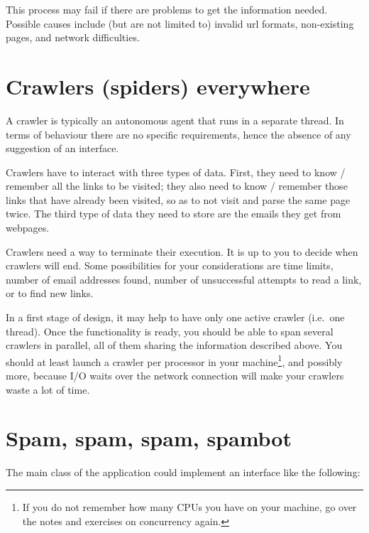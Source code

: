 \documentclass{article}
\begin{document}
This process may fail if there are problems to get the information
needed. Possible causes include (but are not limited to) invalid url
formats, non-existing pages, and network difficulties. 


\section{Crawlers (spiders) everywhere}
\label{sec:crawl-spid-everywh}

A crawler is typically an autonomous agent that runs in a separate
thread. In terms of behaviour there are no specific requirements,
hence the absence of any suggestion of an interface. 

Crawlers have to interact with three types of data. First, they need to
know / remember all the links to be visited; they also need to know /
remember those links that have already been visited, so as to not
visit and parse the same page twice. The third type of data they need
to store are the emails they get from webpages. 

Crawlers need a way to terminate their execution. It is up to you to
decide when crawlers will end. Some possibilities for your
considerations are time limits, number of email addresses found,
number of unsuccessful attempts to read a link, or to find new links.

In a first stage of design, it may help to have only one active
crawler (i.e.~one thread). Once the functionality is ready, you should
be able to span several crawlers in parallel, all of them sharing the
information described above. You should at least launch a crawler per
processor in your machine\footnote{If you do not remember how many
  CPUs you have on your machine, go over the notes and exercises on
  concurrency again.}, and possibly more, because I/O waits over the
network connection will make your crawlers waste a lot of time.


\section{Spam, spam, spam, spambot}
\label{sec:spambot}

The main class of the application could implement an interface like
the following: 
\end{document}
